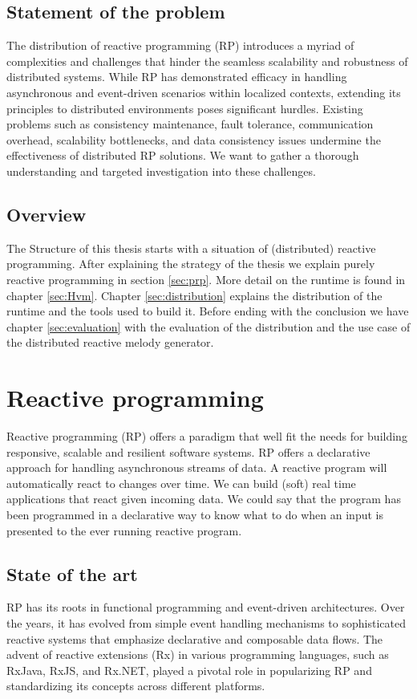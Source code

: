 \documentclass[a4paper]{book}
\begin{document}
\section{Statement of the problem}
The distribution of reactive programming (RP) introduces a myriad of complexities and challenges that hinder the seamless scalability and robustness of distributed systems. While RP has demonstrated efficacy in handling asynchronous and event-driven scenarios within localized contexts, extending its principles to distributed environments poses significant hurdles. Existing problems such as consistency maintenance, fault tolerance, communication overhead, scalability bottlenecks, and data consistency issues undermine the effectiveness of distributed RP solutions. We want to gather a thorough understanding and targeted investigation into these challenges.

\section{Overview}
The Structure of this thesis starts with a situation of (distributed) reactive programming. After explaining the strategy of the thesis we explain purely reactive programming in section \ref{sec:prp}. More detail on the runtime is found in chapter \ref{sec:Hvm}. Chapter \ref{sec:distribution} explains the distribution of the runtime and the tools used to build it. Before ending with the conclusion we have chapter \ref{sec:evaluation} with the evaluation of the distribution and the use case of the distributed reactive melody generator. 

\chapter{Reactive programming}

Reactive programming (RP) offers a paradigm that well fit the needs for building responsive, scalable and resilient software systems. RP offers a declarative approach for handling asynchronous streams of data. A reactive program will automatically react to changes over time. We can build (soft) real time applications that react given incoming data. We could say that the program has been programmed in a declarative way to know what to do when an input is presented to the ever running reactive program. 

\section{State of the art}
RP has its roots in functional programming and event-driven architectures. Over the years, it has evolved from simple event handling mechanisms to sophisticated reactive systems that emphasize declarative and composable data flows. The advent of reactive extensions (Rx) in various programming languages, such as RxJava, RxJS, and Rx.NET, played a pivotal role in popularizing RP and standardizing its concepts across different platforms.
\end{document}
